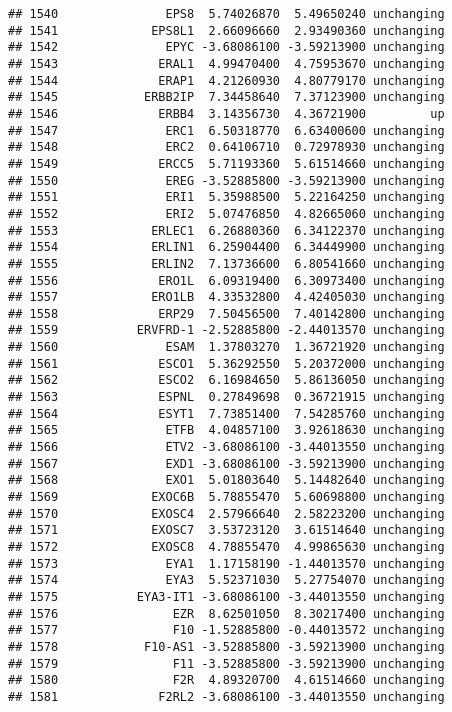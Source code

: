 \documentclass[]{article}
\begin{document}
\begin{verbatim}
## 1540               EPS8  5.74026870  5.49650240 unchanging
## 1541             EPS8L1  2.66096660  2.93490360 unchanging
## 1542               EPYC -3.68086100 -3.59213900 unchanging
## 1543              ERAL1  4.99470400  4.75953670 unchanging
## 1544              ERAP1  4.21260930  4.80779170 unchanging
## 1545            ERBB2IP  7.34458640  7.37123900 unchanging
## 1546              ERBB4  3.14356730  4.36721900         up
## 1547               ERC1  6.50318770  6.63400600 unchanging
## 1548               ERC2  0.64106710  0.72978930 unchanging
## 1549              ERCC5  5.71193360  5.61514660 unchanging
## 1550               EREG -3.52885800 -3.59213900 unchanging
## 1551               ERI1  5.35988500  5.22164250 unchanging
## 1552               ERI2  5.07476850  4.82665060 unchanging
## 1553             ERLEC1  6.26880360  6.34122370 unchanging
## 1554             ERLIN1  6.25904400  6.34449900 unchanging
## 1555             ERLIN2  7.13736600  6.80541660 unchanging
## 1556              ERO1L  6.09319400  6.30973400 unchanging
## 1557             ERO1LB  4.33532800  4.42405030 unchanging
## 1558              ERP29  7.50456500  7.40142800 unchanging
## 1559           ERVFRD-1 -2.52885800 -2.44013570 unchanging
## 1560               ESAM  1.37803270  1.36721920 unchanging
## 1561              ESCO1  5.36292550  5.20372000 unchanging
## 1562              ESCO2  6.16984650  5.86136050 unchanging
## 1563              ESPNL  0.27849698  0.36721915 unchanging
## 1564              ESYT1  7.73851400  7.54285760 unchanging
## 1565               ETFB  4.04857100  3.92618630 unchanging
## 1566               ETV2 -3.68086100 -3.44013550 unchanging
## 1567               EXD1 -3.68086100 -3.59213900 unchanging
## 1568               EXO1  5.01803640  5.14482640 unchanging
## 1569             EXOC6B  5.78855470  5.60698800 unchanging
## 1570             EXOSC4  2.57966640  2.58223200 unchanging
## 1571             EXOSC7  3.53723120  3.61514640 unchanging
## 1572             EXOSC8  4.78855470  4.99865630 unchanging
## 1573               EYA1  1.17158190 -1.44013570 unchanging
## 1574               EYA3  5.52371030  5.27754070 unchanging
## 1575           EYA3-IT1 -3.68086100 -3.44013550 unchanging
## 1576                EZR  8.62501050  8.30217400 unchanging
## 1577                F10 -1.52885800 -0.44013572 unchanging
## 1578            F10-AS1 -3.52885800 -3.59213900 unchanging
## 1579                F11 -3.52885800 -3.59213900 unchanging
## 1580                F2R  4.89320700  4.61514660 unchanging
## 1581              F2RL2 -3.68086100 -3.44013550 unchanging

\end{verbatim}
\end{document}
